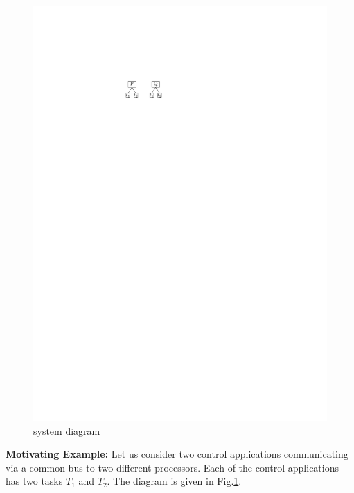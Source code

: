 \begin{figure}
\begin{center}
\includegraphics{control_application.pdf}
\end{center}
\caption{system diagram}
\label{sys_dig}
\end{figure}

\textbf{Motivating Example:}
Let us consider two control applications communicating via a common bus to two 
different processors. Each of the control applications has two tasks $T_1$ and $T_2$.
The diagram is given in Fig.\ref{sys_dig}.

